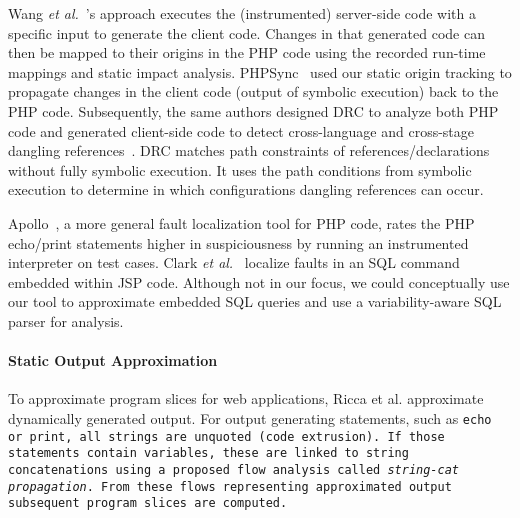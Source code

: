 Wang {\em et al.}~\cite{wang-fse12}'s approach executes the
(instrumented) server-side code with a specific input to generate the
client code. Changes in that generated code can then be mapped to
their origins in the PHP code using the recorded run-time mappings and
static impact analysis.
%
PHPSync~\cite{phpsync} used our static origin tracking to propagate
changes in the client code (output of symbolic execution) back to the
PHP code. Subsequently, the same authors designed DRC to analyze both
PHP code and generated client-side code to detect cross-language and
cross-stage dangling references~\cite{drc-ase13}. DRC matches path
constraints of references/declarations without fully symbolic
execution. It uses the path conditions from symbolic execution to
determine in which configurations dangling references can occur.
%


Apollo~\cite{artzi-icse10,artzi-tse10}, a more general fault
localization tool for PHP code, rates the PHP echo/print
statements higher in suspiciousness by running an instrumented
interpreter on test cases. Clark {\em et al.}~\cite{clark-ase11}
localize faults in an SQL command embedded within JSP code. Although
not in our focus, we could conceptually use our tool to approximate
embedded SQL queries and use a variability-aware SQL parser for
analysis.





\paragraph{Static Output Approximation}
To approximate program slices for web applications, Ricca et
al. \cite{tonella_web_2005,tonella_2001,tonella_2002} approximate
dynamically generated output. For output generating statements, such
as \tt{echo} or \tt{print}, all strings are unquoted (code
extrusion). If those statements contain variables, these are linked to
string concatenations using a proposed flow analysis called
\emph{string-cat propagation}. From these flows representing
approximated output subsequent program slices are computed.

